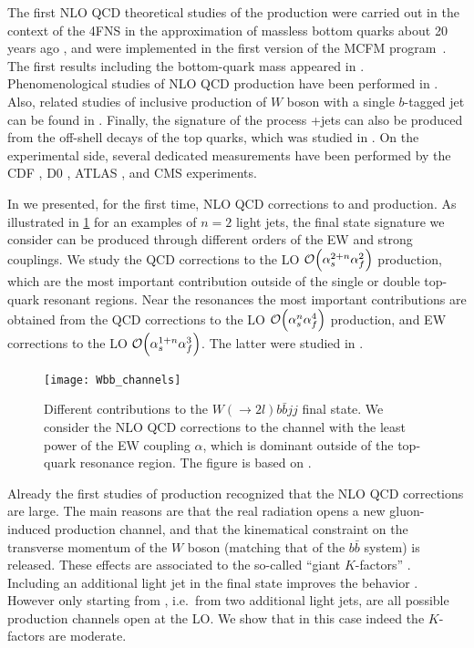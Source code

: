 The first NLO QCD theoretical studies of the \Wbb{} production were carried out in 
the context of the 4FNS in the approximation of massless bottom quarks about 20 years ago \cite{Bern:1997sc,Ellis:1998fv},
and were implemented in the first version of the MCFM program~\cite{mcfm7}.
The first results including the bottom-quark mass appeared in \cite{FebresCordero:2006sj,Cordero:2009kv,Badger:2010mg,Oleari:2011ey}.
Phenomenological studies of NLO QCD \Wbbnj[1]{} production have been performed in \cite{Luisoni:2015mpa}.
Also, related studies of inclusive production of $W$ boson with a single $b$-tagged jet
can be found in \cite{Campbell:2006cu,Campbell:2008hh,Caola:2011pz}.
Finally, the signature of the process \Wbb{}+jets can also be produced from
the off-shell decays of the top quarks, which was studied in \cite{Denner:2017kzu}.
On the experimental side, several dedicated measurements
have been performed by the CDF \cite{Aaltonen:2009qi}, D0 \cite{D0:2012qt}, ATLAS \cite{Aad:2013vka}, and CMS \cite{Chatrchyan:2013uza,CMS:2016bb}
experiments.

In \cite{Anger:2017glm} we presented, for the first time, NLO QCD corrections to \Wbbnj[2]{} and
\Wbbnj[3]{} production. As illustrated in \cref{fig:wbb_channels} for an examples of $n=2$ light jets,
the final state signature we consider can be produced through different orders of the EW and strong couplings.
We study the QCD corrections to the LO $\order{\alps^{2+n}\alpf^2}$ production,
which are the most important contribution outside of the single or double top-quark resonant regions.
Near the resonances the most important contributions are obtained from the QCD corrections to the LO $\order{\alps^{n}\alpf^4}$ production,
and EW corrections to the LO $\order{\alps^{1+n}\alpf^3}$. The latter were studied in \cite{Denner:2017kzu}.

\begin{figure}[t]
  \centering
  \texttt{[image: Wbb\_channels]}
  \caption{
    Different contributions to the $W(\to 2l)b\bar{b}jj$ final state.
    We consider the NLO QCD corrections to the channel with the least power of the EW coupling $\alpha$, which
    is dominant outside of the top-quark resonance region.
    The figure is based on \cite{Denner:2017kzu}.
  }
  \label{fig:wbb_channels}
\end{figure}


Already the first studies of \Wbb{} production
\cite{Ellis:1998fv,FebresCordero:2006sj,Cordero:2009kv} recognized that the NLO QCD corrections are large. 
The main reasons are that the real radiation opens a new
gluon-induced production channel, and that
the kinematical constraint on the transverse momentum of  the $W$ boson (matching that of the $b\bar{b}$ system) is released.
These effects are associated to the so-called ``giant $K$-factors'' \cite{Rubin:2010xp}. 
Including an additional light jet in the final state improves the  behavior \cite{Luisoni:2015mpa}.
However only starting from \Wbbnj[2]{}, i.e.\ from two additional light jets, are all possible production
channels open at the LO.  We show that in this case indeed the $K$-factors are moderate.


